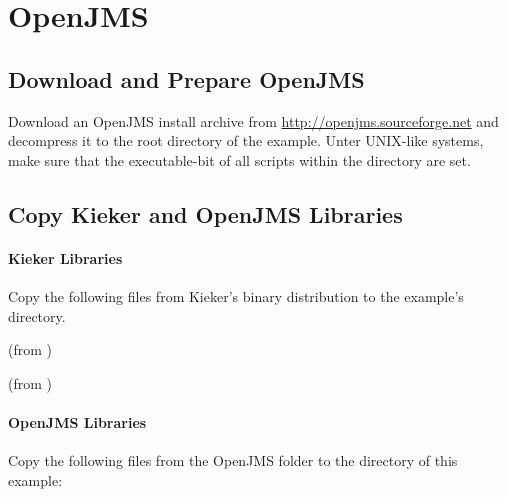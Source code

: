 \section{OpenJMS}\label{example:jms:openjms}

\subsection{Download and Prepare OpenJMS}

Download an OpenJMS install archive from \url{http://openjms.sourceforge.net} %
and decompress it to the root directory of the example. Unter UNIX-like systems, make sure that the executable-bit of all scripts within the  directory are set.

\subsection{Copy Kieker and OpenJMS Libraries}

\paragraph*{Kieker Libraries}

Copy the following files from Kieker's binary distribution to %
the example's  directory.

\medskip

\begin{compactenum}
 \item \file{\mainJarEMF} (from )
 \item \file{\commonsLoggingJar} (from )
\end{compactenum}

\paragraph*{OpenJMS Libraries}

Copy the following files from the OpenJMS  folder to the %
 directory of this example:

\medskip

\begin{compactenum}
\item {}
\item {}
\item {}
\item {}
\item {}
\item {}
\end{compactenum}

